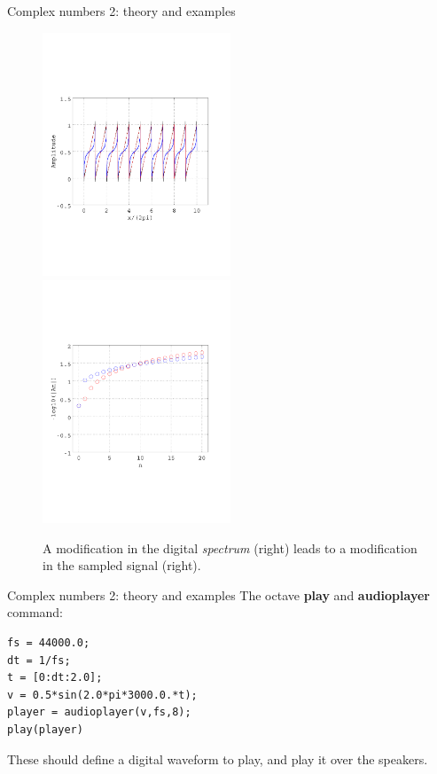 \documentclass{beamer}
\begin{document}
\begin{frame}[fragile]{Complex numbers 2: theory and examples}
\begin{figure}
\centering
\includegraphics[width=0.5\textwidth,trim=1cm 6cm 1cm 7cm,clip=true]{figures/saw1.pdf}
\includegraphics[width=0.5\textwidth,trim=1cm 6cm 1cm 7cm,clip=true]{figures/saw_coeff_mod.pdf}
\caption{\label{fig:saw2} A modification in the digital \textit{spectrum} (right) leads to a modification in the sampled signal (right).}
\end{figure}
\end{frame}

\begin{frame}[fragile]{Complex numbers 2: theory and examples}
The octave \textbf{play} and \textbf{audioplayer} command:
\begin{verbatim}
fs = 44000.0;
dt = 1/fs;
t = [0:dt:2.0];
v = 0.5*sin(2.0*pi*3000.0.*t);
player = audioplayer(v,fs,8);
play(player)
\end{verbatim}
These should define a digital waveform to play, and play it over the speakers.
\end{frame}
\end{document}
